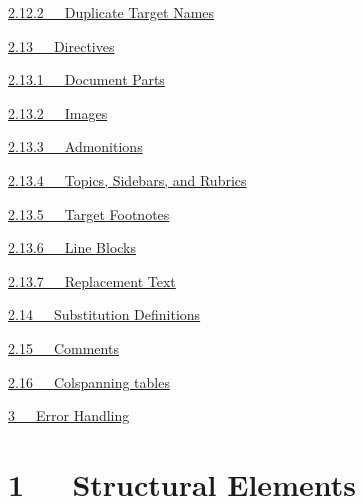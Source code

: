 \documentclass[10pt,a4paper,english]{article}
\begin{document}
\begin{list}{}{}
\begin{list}{}{}
\begin{list}{}{}
\item {} \href{\#id18}{2.12.2~~~Duplicate Target Names}

\end{list}

\item {} \href{\#directives}{2.13~~~Directives}
\begin{list}{}{}
\item {} \href{\#document-parts}{2.13.1~~~Document Parts}

\item {} \href{\#images}{2.13.2~~~Images}

\item {} \href{\#admonitions}{2.13.3~~~Admonitions}

\item {} \href{\#topics-sidebars-and-rubrics}{2.13.4~~~Topics, Sidebars, and Rubrics}

\item {} \href{\#target-footnotes}{2.13.5~~~Target Footnotes}

\item {} \href{\#line-blocks}{2.13.6~~~Line Blocks}

\item {} \href{\#replacement-text}{2.13.7~~~Replacement Text}

\end{list}

\item {} \href{\#substitution-definitions}{2.14~~~Substitution Definitions}

\item {} \href{\#comments}{2.15~~~Comments}

\item {} \href{\#colspanning-tables}{2.16~~~Colspanning tables}

\end{list}

\item {} \href{\#error-handling}{3~~~Error Handling}

\end{list}




\hypertarget{structural-elements}{}
\section*{1~~~Structural Elements}
\end{document}
